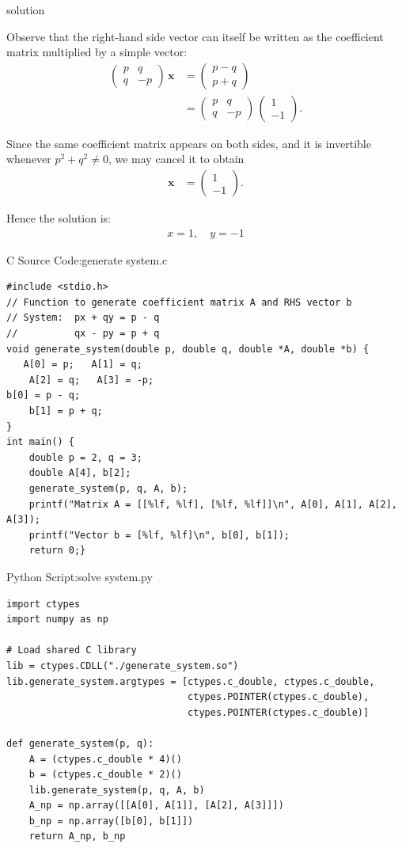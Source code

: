 \documentclass{beamer}
\numberwithin{equation}{section}
\theoremstyle{remark}
\newcommand{\myvec}[1]{\ensuremath{\begin{pmatrix}#1\end{pmatrix}}}
\let\vec\mathbf
\begin{document}
\begin{frame}{solution}

\noindent
Observe that the right-hand side vector can itself be written as the coefficient 
matrix multiplied by a simple vector:
\begin{align}
\myvec{p & q\\ q & -p}\,\vec{x}
&= \myvec{p-q\\ p+q} \\[6pt]
&= \myvec{p & q\\ q & -p}\,\myvec{1\\ -1}. \tag{6}
\end{align}

\noindent
Since the same coefficient matrix appears on both sides, and it is invertible 
whenever $p^2+q^2 \neq 0$, we may cancel it to obtain
\begin{align}
\vec{x} &= \myvec{1\\ -1}.
\end{align}



Hence the solution is:
\begin{align}
x = 1, \quad y = -1
\end{align}
\end{frame}
\begin{frame}[fragile]{C Source Code:generate system.c}
\begin{verbatim}
#include <stdio.h>
// Function to generate coefficient matrix A and RHS vector b
// System:  px + qy = p - q
//          qx - py = p + q
void generate_system(double p, double q, double *A, double *b) {
   A[0] = p;   A[1] = q;
    A[2] = q;   A[3] = -p;
b[0] = p - q;
    b[1] = p + q;
}
int main() {
    double p = 2, q = 3;
    double A[4], b[2];
    generate_system(p, q, A, b);
    printf("Matrix A = [[%lf, %lf], [%lf, %lf]]\n", A[0], A[1], A[2], A[3]);
    printf("Vector b = [%lf, %lf]\n", b[0], b[1]);
    return 0;}

\end{verbatim}
\end{frame}

\begin{frame}[fragile]{Python Script:solve system.py}
\begin{verbatim}
import ctypes
import numpy as np

# Load shared C library
lib = ctypes.CDLL("./generate_system.so")
lib.generate_system.argtypes = [ctypes.c_double, ctypes.c_double,
                                ctypes.POINTER(ctypes.c_double),
                                ctypes.POINTER(ctypes.c_double)]

def generate_system(p, q):
    A = (ctypes.c_double * 4)()
    b = (ctypes.c_double * 2)()
    lib.generate_system(p, q, A, b)
    A_np = np.array([[A[0], A[1]], [A[2], A[3]]])
    b_np = np.array([b[0], b[1]])
    return A_np, b_np
\end{verbatim}
\end{frame}
\end{document}

